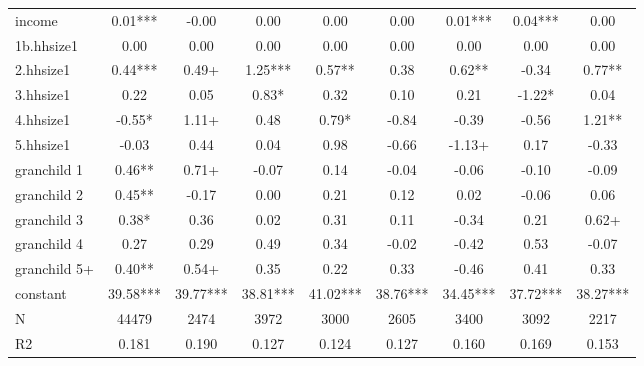 {\begin{tabular}{l*{8}{c}}
income      &        0.01***&       -0.00   &        0.00   &        0.00   &        0.00   &        0.01***&        0.04***&        0.00   \\
1b.hhsize1  &        0.00   &        0.00   &        0.00   &        0.00   &        0.00   &        0.00   &        0.00   &        0.00   \\
2.hhsize1   &        0.44***&        0.49+  &        1.25***&        0.57** &        0.38   &        0.62** &       -0.34   &        0.77** \\
3.hhsize1   &        0.22   &        0.05   &        0.83*  &        0.32   &        0.10   &        0.21   &       -1.22*  &        0.04   \\
4.hhsize1   &       -0.55*  &        1.11+  &        0.48   &        0.79*  &       -0.84   &       -0.39   &       -0.56   &        1.21** \\
5.hhsize1   &       -0.03   &        0.44   &        0.04   &        0.98   &       -0.66   &       -1.13+  &        0.17   &       -0.33   \\
granchild 1 &        0.46** &        0.71+  &       -0.07   &        0.14   &       -0.04   &       -0.06   &       -0.10   &       -0.09   \\
granchild 2 &        0.45** &       -0.17   &        0.00   &        0.21   &        0.12   &        0.02   &       -0.06   &        0.06   \\
granchild 3 &        0.38*  &        0.36   &        0.02   &        0.31   &        0.11   &       -0.34   &        0.21   &        0.62+  \\
granchild 4 &        0.27   &        0.29   &        0.49   &        0.34   &       -0.02   &       -0.42   &        0.53   &       -0.07   \\
granchild 5+&        0.40** &        0.54+  &        0.35   &        0.22   &        0.33   &       -0.46   &        0.41   &        0.33   \\
constant    &       39.58***&       39.77***&       38.81***&       41.02***&       38.76***&       34.45***&       37.72***&       38.27***\\
\hline
N           &       44479   &        2474   &        3972   &        3000   &        2605   &        3400   &        3092   &        2217   \\
R2          &       0.181   &       0.190   &       0.127   &       0.124   &       0.127   &       0.160   &       0.169   &       0.153   \\
\hline\hline
\end{tabular}
}
